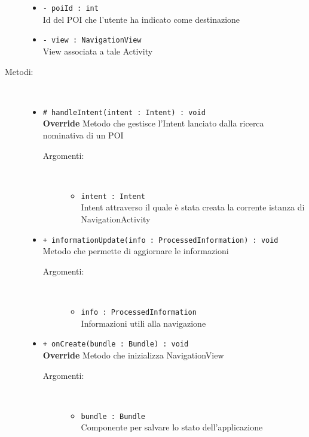 \documentclass[../DefinizioneDiProdotto.tex]{subfiles}
\begin{document}
\begin{description}
\begin{itemize}
		\item \texttt{- poiId : int}\\
		Id del POI che l'utente ha indicato come destinazione
		
		\item \texttt{- view : NavigationView}\\
		View associata a tale Activity
		
	\end{itemize}
	\item[Metodi:] \
	\begin{itemize}
		\item \texttt{\# handleIntent(intent : Intent) : void}\\
		\textbf{Override} Metodo che gestisce l'Intent lanciato dalla ricerca nominativa di un POI
		\begin{description}
			\item[Argomenti:] \
			\begin{itemize}
				\item \texttt{intent : Intent}\\
				Intent attraverso il quale è stata creata la corrente istanza di NavigationActivity\end{itemize}
		\end{description}
		\item \texttt{+ informationUpdate(info : ProcessedInformation) : void}\\
		Metodo che permette di aggiornare le informazioni
		\begin{description}
			\item[Argomenti:] \
			\begin{itemize}
				\item \texttt{info : ProcessedInformation}\\
				Informazioni utili alla navigazione\end{itemize}
		\end{description}
		\item \texttt{+ onCreate(bundle : Bundle) : void}\\
		\textbf{Override} Metodo che inizializza NavigationView
		\begin{description}
			\item[Argomenti:] \
			\begin{itemize}
				\item \texttt{bundle : Bundle}\\
				Componente per salvare lo stato dell'applicazione\end{itemize}
		\end{description}

\end{itemize}
\end{description}
\end{document}
